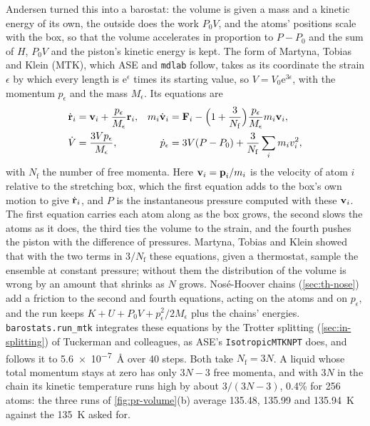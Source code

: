 Andersen turned this into a barostat\cite{Andersen1980}: the volume is
given a mass and a kinetic energy of its own, the outside does the work
$P_0V$, and the atoms' positions scale with the box, so that the volume
accelerates in proportion to $P - P_0$ and the sum of $H$, $P_0V$ and the
piston's kinetic energy is kept. The form of Martyna, Tobias and Klein
(MTK)\cite{Martyna1994}, which ASE and \texttt{mdlab} follow, takes as its coordinate the strain $\epsilon$
by which every length is $\mathrm{e}^\epsilon$ times its starting value, so
$V = V_0\mathrm{e}^{3\epsilon}$, with the momentum $p_\epsilon$ and the
mass $M_\epsilon$. Its equations are
\begin{align*}
   \dot{\bm{\mathrm{r}}}_i &= \bm{\mathrm{v}}_i + \frac{p_\epsilon}{M_\epsilon}\bm{\mathrm{r}}_i ,
   & m_i\dot{\bm{\mathrm{v}}}_i &= \bm{\mathrm{F}}_i - \Bigl(1 + \frac{3}{N_{\mathrm f}}\Bigr)
   \frac{p_\epsilon}{M_\epsilon}m_i\bm{\mathrm{v}}_i ,\\
   \dot V &= \frac{3Vp_\epsilon}{M_\epsilon} ,
   & \dot p_\epsilon &= 3V(P - P_0) + \frac{3}{N_{\mathrm f}}\sum_im_iv_i^2 ,
\end{align*}
with $N_{\mathrm f}$ the number of free momenta. Here $\bm{\mathrm{v}}_i =
\bm{\mathrm{p}}_i/m_i$ is the velocity of atom $i$ relative to the stretching box,
which the first equation adds to the box's own motion to give
$\dot{\bm{\mathrm{r}}}_i$, and $P$ is the instantaneous pressure computed with
these $\bm{\mathrm{v}}_i$. The first equation carries each atom along as the box
grows, the second slows the atoms as it does, the third ties the volume
to the strain, and the fourth pushes the piston with the difference of
pressures. Martyna, Tobias and Klein showed that with the two terms in
$3/N_{\mathrm f}$ these equations, given a thermostat, sample the ensemble
at constant pressure; without them the distribution of the volume is
wrong by an amount that shrinks as $N$ grows. Nosé-Hoover chains
(\cref{sec:th-nose}) add a friction to the second and fourth equations,
acting on the atoms and on $p_\epsilon$, and the run keeps $K + U + P_0V +
p_\epsilon^2/2M_\epsilon$ plus the chains' energies.
\texttt{barostats.run\_mtk} integrates these equations by the Trotter
splitting (\cref{sec:in-splitting}) of Tuckerman and
colleagues\cite{Tuckerman2006}, as ASE's
\texttt{IsotropicMTKNPT} does, and follows it to \SI{5.6e-7}{\angstrom}
over 40 steps. Both take $N_{\mathrm f} = 3N$. A liquid whose total
momentum stays at zero has only $3N - 3$ free momenta, and with $3N$ in
the chain its kinetic temperature runs high by about $3/(3N - 3)$, 0.4\%
for 256 atoms: the three runs of \cref{fig:pr-volume}(b) average 135.48,
135.99 and \SI{135.94}{\kelvin} against the \SI{135}{\kelvin} asked
for.

